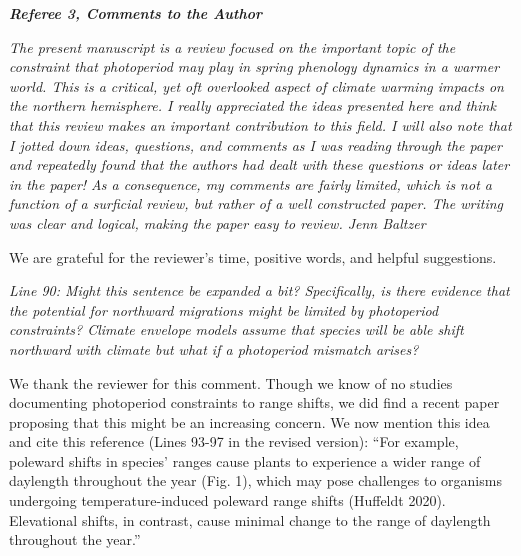 \documentclass{article}
\begin{document}
\emph{{\bf Referee 3, Comments to the Author}}
\par \emph{The present manuscript is a review focused on the important topic of the constraint that photoperiod may play in spring phenology dynamics in a warmer world. This is a critical, yet oft overlooked aspect of climate warming impacts on the northern hemisphere. I really appreciated the ideas presented here and think that this review makes an important contribution to this field. I will also note that I jotted down ideas, questions, and comments as I was reading through the paper and repeatedly found that the authors had dealt with these questions or ideas later in the paper! As a consequence, my comments are fairly limited, which is not a function of a surficial review, but rather of a well constructed paper. The writing was clear and logical, making the paper easy to review. Jenn Baltzer}
\par We are grateful for the reviewer's time, positive words, and helpful suggestions.

\par \emph{Line 90: Might this sentence be expanded a bit? Specifically, is there evidence that the potential for northward migrations might be limited by photoperiod constraints? Climate envelope models assume that species will be able shift northward with climate but what if a photoperiod mismatch arises? }
\par We thank the reviewer for this comment. Though we know of no studies documenting photoperiod constraints to range shifts, we did find a recent paper proposing that this might be an increasing concern. We now mention this idea and cite this reference (Lines 93-97 in the revised version):
``For example, poleward shifts in species' ranges cause plants to experience a wider range of daylength throughout the year (Fig. 1), which may pose challenges to organisms undergoing temperature-induced poleward range shifts (Huffeldt 2020). Elevational shifts, in contrast, cause minimal change to the range of daylength throughout the year.''
\end{document}
